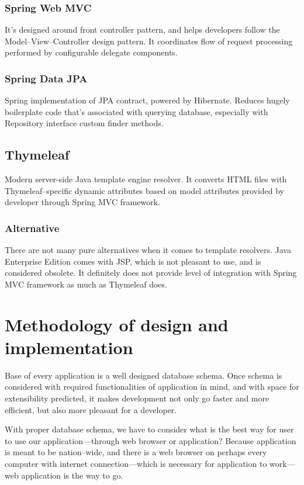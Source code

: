 \documentclass[a4paper,twoside,12pt]{book}
\begin{document}
      \subsubsection{Spring Web MVC}
        It's designed around front controller pattern, and helps developers follow the Model--View--Controller design pattern.
        It coordinates flow of request processing performed by configurable delegate components\cite{bib:spring_web_mvc}.
      
      \subsubsection{Spring Data JPA}
        Spring implementation of JPA contract, powered by Hibernate. Reduces hugely boilerplate code that's associated with querying database,
        especially with Repository interface custom finder methods\cite{bib:spring_data_jpa}.

    \subsection{Thymeleaf}
      Modern server-side Java template engine resolver. 
      It converts HTML files with Thymeleaf--specific dynamic attributes based on model attributes provided by developer through Spring MVC framework\cite{bib:thymeleaf}.
      
      \subsubsection{Alternative}
        There are not many pure alternatives when it comes to template resolvers. 
        Java Enterprise Edition comes with JSP, which is not pleasant to use, and is considered obsolete.
        It definitely does not provide level of integration with Spring MVC framework as much as Thymeleaf does.

  \section{Methodology of design and implementation}
    Base of every application is a well designed database schema. 
    Once schema is considered with required functionalities of application in mind, and with space for extensibility predicted,
    it makes development not only go faster and more efficient, but also more pleasant for a developer.

    With proper database schema, we have to consider what is the best way for user to use our application---through web browser or application?
    Because application is meant to be nation--wide, 
    and there is a web browser on perhaps every computer with internet connection---which is necessary for application to work---web application is the way to go.
    
\end{document}
